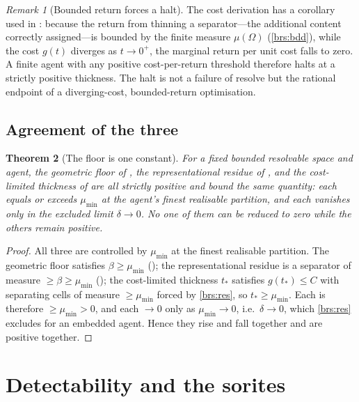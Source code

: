 \documentclass[11pt,a4paper]{article}
\theoremstyle{thmstyle}
\newtheorem{theorem}{Theorem}[section]
\theoremstyle{definition}
\theoremstyle{remark}
\newtheorem{remark}[theorem]{Remark}
\newcommand{\Space}{\Omega}
\newcommand{\thick}{\beta}
\newcommand{\reso}{\delta}
\begin{document}
\begin{remark}[Bounded return forces a halt]
\label{rem:bounded-return}
The cost derivation has a corollary used in : because the
return from thinning a separator---the additional content correctly assigned---is
bounded by the finite measure $\mu(\Space)$ (\ref{brs:bdd}), while the cost
$g(t)$ diverges as $t\to0^+$, the marginal return per unit cost falls to zero.
A finite agent with any positive cost-per-return threshold therefore halts at a
strictly positive thickness. The halt is not a failure of resolve but the
rational endpoint of a diverging-cost, bounded-return optimisation.
\end{remark}

\subsection{Agreement of the three}

\begin{theorem}[The floor is one constant]
\label{thm:floor-agree}
For a fixed bounded resolvable space and agent, the geometric floor of
, the representational residue of , and
the cost-limited thickness of  are all strictly positive and
bound the same quantity: each equals or exceeds $\mu_{\min}$ at the agent's
finest realisable partition, and each vanishes only in the excluded limit
$\reso\to0$. No one of them can be reduced to zero while the others remain
positive.
\end{theorem}

\begin{proof}
All three are controlled by $\mu_{\min}$ at the finest realisable partition. The
geometric floor satisfies $\thick\ge\mu_{\min}$ (); the
representational residue is a separator of measure $\ge\thick\ge\mu_{\min}$
(); the cost-limited thickness $t_\ast$ satisfies
$g(t_\ast)\le C$ with separating cells of measure $\ge\mu_{\min}$ forced by
\ref{brs:res}, so $t_\ast\ge\mu_{\min}$. Each is therefore $\ge\mu_{\min}>0$, and
each $\to0$ only as $\mu_{\min}\to0$, i.e.\ $\reso\to0$, which \ref{brs:res}
excludes for an embedded agent. Hence they rise and fall together and are
positive together.
\end{proof}


\section{Detectability and the sorites}
\label{sec:detect}
\end{document}
